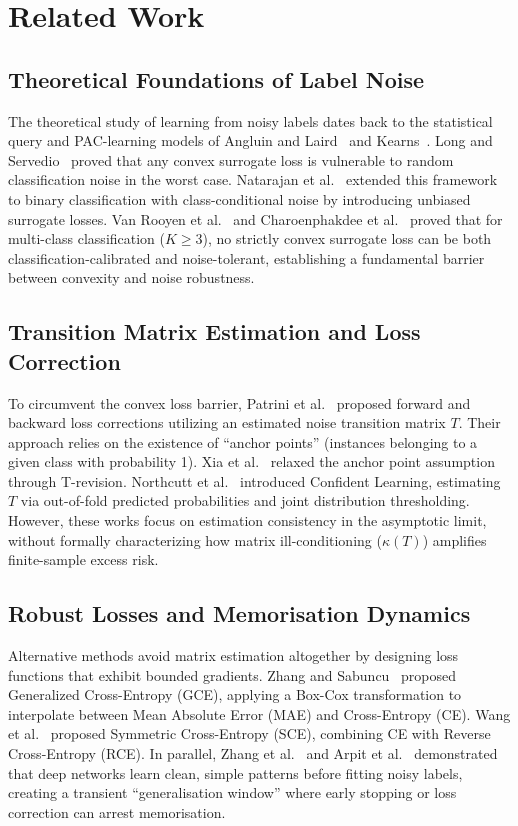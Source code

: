 \documentclass[10pt,twocolumn]{article}
\theoremstyle{definition}
\begin{document}
\section{Related Work}

\subsection{Theoretical Foundations of Label Noise}
The theoretical study of learning from noisy labels dates back to the statistical query and PAC-learning models of Angluin and Laird~\cite{angluin1988learning} and Kearns~\cite{kearns1998efficient}. Long and Servedio~\cite{long2010random} proved that any convex surrogate loss is vulnerable to random classification noise in the worst case. Natarajan et al.~\cite{natarajan2013learning} extended this framework to binary classification with class-conditional noise by introducing unbiased surrogate losses. Van Rooyen et al.~\cite{van2015learning} and Charoenphakdee et al.~\cite{charoenphakdee2019symmetric} proved that for multi-class classification ($K \ge 3$), no strictly convex surrogate loss can be both classification-calibrated and noise-tolerant, establishing a fundamental barrier between convexity and noise robustness.

\subsection{Transition Matrix Estimation and Loss Correction}
To circumvent the convex loss barrier, Patrini et al.~\cite{patrini2017making} proposed forward and backward loss corrections utilizing an estimated noise transition matrix $T$. Their approach relies on the existence of ``anchor points'' (instances belonging to a given class with probability 1). Xia et al.~\cite{xia2019are} relaxed the anchor point assumption through T-revision. Northcutt et al.~\cite{northcutt2021confident} introduced Confident Learning, estimating $T$ via out-of-fold predicted probabilities and joint distribution thresholding. However, these works focus on estimation consistency in the asymptotic limit, without formally characterizing how matrix ill-conditioning ($\kappa(T)$) amplifies finite-sample excess risk.

\subsection{Robust Losses and Memorisation Dynamics}
Alternative methods avoid matrix estimation altogether by designing loss functions that exhibit bounded gradients. Zhang and Sabuncu~\cite{zhang2018generalized} proposed Generalized Cross-Entropy (GCE), applying a Box-Cox transformation to interpolate between Mean Absolute Error (MAE) and Cross-Entropy (CE). Wang et al.~\cite{wang2019symmetric} proposed Symmetric Cross-Entropy (SCE), combining CE with Reverse Cross-Entropy (RCE). In parallel, Zhang et al.~\cite{zhang2017understanding} and Arpit et al.~\cite{arpit2017closer} demonstrated that deep networks learn clean, simple patterns before fitting noisy labels, creating a transient ``generalisation window'' where early stopping or loss correction can arrest memorisation.
\end{document}
